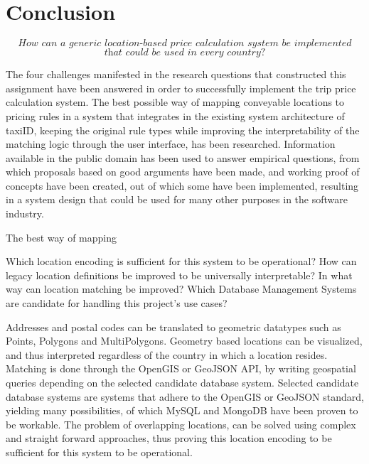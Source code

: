 \graphicspath{{Chapter7/Figs/Vector/}{Chapter7/Figs/}}

%
\chapter{Conclusion}
\[\textit{How can a generic location-based price calculation system be implemented}\]
\[\textit{that could be used in every country?}\] \hfill

The four challenges manifested in the research questions that constructed this assignment have been answered in order to successfully implement the trip price calculation system. The best possible way of mapping conveyable locations to pricing rules in a system that integrates in the existing system architecture of taxiID, keeping the original rule types while improving the interpretability of the matching logic through the user interface, has been researched. Information available in the public domain has been used to answer empirical questions, from which proposals based on good arguments have been made, and working proof of concepts have been created, out of which some have been implemented, resulting in a system design that could be used for many other purposes in the software industry.

The best way of mapping

Which location encoding is sufficient for this system to be operational?
How can legacy location definitions be improved to be universally interpretable?
In what way can location matching be improved?
Which Database Management Systems are candidate for handling this project's use cases?

Addresses and postal codes can be translated to geometric datatypes such as Points, Polygons and MultiPolygons. Geometry based locations can be visualized, and thus interpreted regardless of the country in which a location resides. Matching is done through the OpenGIS or GeoJSON API, by writing geospatial queries depending on the selected candidate database system. Selected candidate database systems are systems that adhere to the OpenGIS or GeoJSON standard, yielding many possibilities, of which MySQL and MongoDB have been proven to be workable. The problem of overlapping locations, can be solved using complex and straight forward approaches, thus proving this location encoding to be sufficient for this system to be operational.

